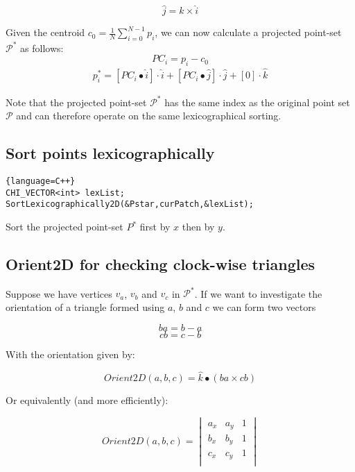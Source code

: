 \documentclass[11pt,letterpaper,titlepage]{article}
\begin{document}
$$
\hat{j} = \hat{k} \times \hat{i}
$$

\noindent Given the centroid $c_0=\frac{1}{N} \sum_{i=0}^{N-1} p_i$, we can now calculate a projected point-set $\mathcal{P}^*$ as follows:
$$
PC_i = p_i - c_0 
$$
\begin{equation*}
\begin{aligned}
p_i^* = [PC_i \bullet \hat{i} ] \cdot \hat{i} 
+ [PC_i \bullet \hat{j} ] \cdot \hat{j}
+ [0] \cdot \hat{k}
\end{aligned}
\end{equation*}

\vspace{0.5cm}
\noindent Note that the projected point-set $\mathcal{P}^*$ has the same index as the original point set $\mathcal{P}$ and can therefore operate on the same lexicographical sorting.


\subsection{Sort points lexicographically}

\vspace{0.5cm}
\begin{lstlisting}{language=C++}
CHI_VECTOR<int> lexList;
SortLexicographically2D(&Pstar,curPatch,&lexList);
\end{lstlisting}


\noindent Sort the projected point-set $P^*$ first by $x$ then by $y$.

\subsection{Orient2D for checking clock-wise triangles}
Suppose we have vertices $v_a$, $v_b$ and $v_c$ in $\mathcal{P}^*$. If we want to investigate the orientation of a triangle formed using $a$, $b$ and $c$ we can form two vectors 

$$ba=b-a$$
$$cb=c-b$$

\noindent With the orientation given by:

$$Orient2D(a,b,c) = \hat{k} \bullet (ba \times cb) $$

\noindent Or equivalently (and more efficiently):

\begin{equation*}
Orient2D(a,b,c)=
\begin{vmatrix}
a_x &a_y &1\\
b_x &b_y &1\\
c_x &c_y &1\\
\end{vmatrix}
\end{equation*}
\end{document}
